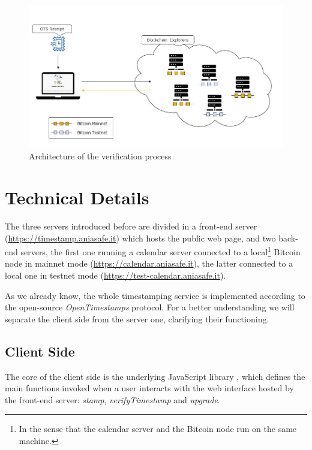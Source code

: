 \bigskip
\begin{figure}[!htb]
    \centering
	\includegraphics[width=1\linewidth]{Images/project-verifying.jpg}
	\caption{Architecture of the verification process}
	\label{fig:ots-project-verifying}
\end{figure}

\bigskip
\section{Technical Details}
The three servers introduced before are divided in a front-end server (\url{https://timestamp.aniasafe.it}) which hosts the public web page, and two back-end servers, the first one running a calendar server connected to a local\footnote{In the sense that the calendar server and the Bitcoin node run on the same machine.} Bitcoin node in mainnet mode (\url{https://calendar.aniasafe.it}), the latter connected to a local one in testnet mode (\url{https://test-calendar.aniasafe.it}).

\bigskip
\noindent
As we already know, the whole timestamping service is implemented according to the open-source \textit{OpenTimestamps} protocol. For a better understanding we will separate the client side from the server one, clarifying their functioning.

\bigskip
\subsection{Client Side}
The core of the client side is the underlying JavaScript library \cite{LibraryRepositoryGitHub}, which defines the main functions invoked when a user interacts with the web interface hosted by the front-end server: \textit{stamp}, \textit{verifyTimestamp} and \textit{upgrade}.

